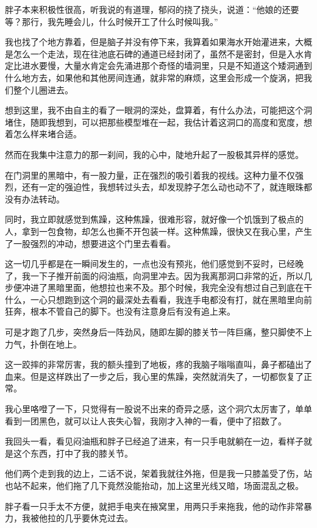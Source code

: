 胖子本来积极性很高，听我说的有道理，郁闷的挠了挠头，说道：“他娘的还要等？那行，我先睡会儿，什么时候开工了什么时候叫我。”

我也找了个地方靠着，但是脑子并没有停下来，我算着如果海水开始灌进来，大概是怎么一个走法，现在往池底石碑的通道已经封闭了，虽然不是密封，但是入水肯定比进水要慢，大量水肯定会先涌进那个奇怪的墙洞里，只是不知道这个矮洞通到什么地方去，如果他和其他房间连通，就非常的麻烦，这里会形成一个旋涡，把我们整个儿圈进去。

想到这里，我不由自主的看了一眼洞的深处，盘算着，有什么办法，可能把这个洞堵住，随即我想到，可以把那些模型堆在一起，我估计着这洞口的高度和宽度，想着怎么样来堵合适。

然而在我集中注意力的那一刹间，我的心中，陡地升起了一股极其异样的感觉。

在门洞里的黑暗中，有一股力量，正在强烈的吸引着我的视线。这种力量不仅强烈，还有一定的强迫性，我想转过头去，却发现脖子怎么动也动不了，就连眼珠都没有办法转动。

同时，我立即就感觉到焦躁，这种焦躁，很难形容，就好像一个饥饿到了极点的人，拿到一包食物，却怎么也撕不开包装一样。这种焦躁，很快又在我心里，产生了一股强烈的冲动，想要进这个门里去看看。

这一切几乎都是在一瞬间发生的，一点也没有预兆，他们感觉到不妥时，已经晚了，我一下子推开前面的闷油瓶，向洞里冲去。因为我离那洞口非常的近，所以几步便冲进了黑暗里面，他想拉也来不及。那个时候，我完全没有想过自己到底在干什么，一心只想跑到这个洞的最深处去看看，我连手电都没有打，就在黑暗里向前狂奔，根本不管自己的脚下。也没有注意身后有没有追上来。

可是才跑了几步，突然身后一阵劲风，随即左脚的膝关节一阵巨痛，整只脚使不上力气，扑倒在地上。

这一跤摔的非常厉害，我的额头撞到了地板，疼的我脑子嗡嗡直叫，鼻子都磕出了血来。但是这样跌出了一步之后，我心里的焦躁，突然就消失了，一切都恢复了正常。

我心里咯噔了一下，只觉得有一股说不出来的奇异之感，这个洞穴太厉害了，单单看到一团黑色，就可以让人丧失心智，我刚才入神的一看，便中了招数了。

我回头一看，看见闷油瓶和胖子已经追了进来，有一只手电就躺在一边，看样子就是这个东西，打中了我的膝关节。

他们两个走到我的边上，二话不说，架着我就往外拖，但是我一只膝盖受了伤，站也站不起来，他们拖了几下竟然没能抬动，加上这里光线又暗，场面混乱之极。

胖子看一只手太不方便，就把手电夹在掖窝里，用两只手来拖我，他的动作非常暴力，我被他拉的几乎要休克过去。

